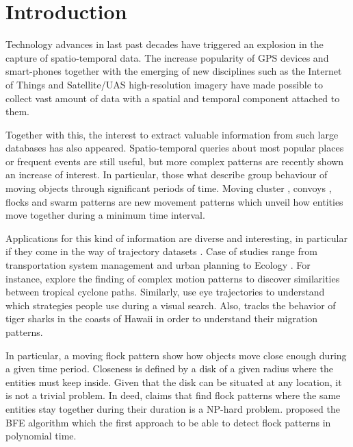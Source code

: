 \section{Introduction}
Technology advances in last past decades have triggered an explosion in the capture of spatio-temporal data.  The increase popularity of GPS devices and smart-phones together with the emerging of new disciplines such as the Internet of Things and Satellite/UAS high-resolution imagery have made possible to collect vast amount of data with a spatial and temporal component attached to them.

Together with this, the interest to extract valuable information from such large databases has also appeared.  Spatio-temporal queries about most popular places 
or frequent events are still useful, but more complex patterns are recently shown an increase of interest.  In particular, those what describe group behaviour 
of moving objects through significant periods of time.  Moving cluster \cite{kalnis_discovering_2005}, convoys \cite{jeung_discovery_2008}, flocks 
\cite{gudmundsson_computing_2006} and swarm patterns \cite{li_swarm_2010} are new movement patterns which unveil how entities move together during a minimum 
time interval. 

Applications for this kind of information are diverse and interesting, in particular if they come in the way of trajectory datasets \cite{jeung_trajectory_2011, 
huang_mining_2015}. Case of studies range from transportation system management and urban planning \cite{di_lorenzo_allaboard_2016} to Ecology 
\cite{la_sorte_convergence_2016}.  For instance, \cite{turdukulov_visual_2014} explore the finding of complex motion patterns to discover similarities between 
tropical cyclone paths.  Similarly, \cite{amor_persistence_2016} use eye trajectories to understand which strategies people use during a visual search. Also, 
\cite{holland_movements_1999} tracks the behavior of tiger sharks in the coasts of Hawaii in order to understand their migration patterns.

In particular, a moving flock pattern show how objects move close enough during a given time period.  Closeness is defined by a disk of a given radius where the 
entities must keep inside.  Given that the disk can be situated at any location, it is not a trivial problem.  In deed, \cite{gudmundsson_computing_2006} claims 
that find flock patterns where the same entities stay together during their duration is a NP-hard problem. \cite{vieira_-line_2009} proposed the BFE algorithm 
which the first approach to be able to detect flock patterns in polynomial time.

